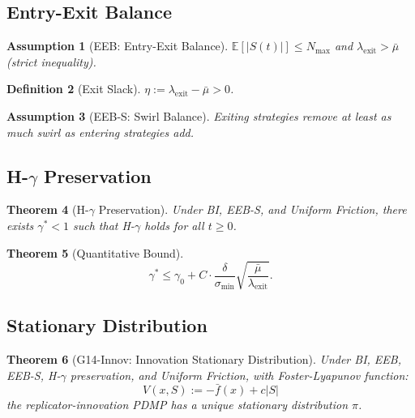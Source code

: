 \documentclass[12pt]{article}
\newtheorem{theorem}{Theorem}[section]
\newtheorem{definition}[theorem]{Definition}
\newtheorem{assumption}[theorem]{Assumption}
\newcommand{\E}{\mathbb{E}}
\begin{document}
\subsection{Entry-Exit Balance}

\begin{assumption}[EEB: Entry-Exit Balance]
$\E[|S(t)|] \leq N_{\max}$ and $\lambda_{\mathrm{exit}} > \bar{\mu}$ (strict inequality).
\end{assumption}

\begin{definition}[Exit Slack]
$\eta := \lambda_{\mathrm{exit}} - \bar{\mu} > 0$.
\end{definition}

\begin{assumption}[EEB-S: Swirl Balance]
Exiting strategies remove at least as much swirl as entering strategies add.
\end{assumption}

\subsection{H-$\gamma$ Preservation}

\begin{theorem}[H-$\gamma$ Preservation]
\label{thm:h-gamma-preservation}
Under BI, EEB-S, and Uniform Friction, there exists $\gamma^* < 1$ such that H-$\gamma$ holds for all $t \geq 0$.
\end{theorem}

\begin{theorem}[Quantitative Bound]
\[
\gamma^* \leq \gamma_0 + C \cdot \frac{\delta}{\sigma_{\min}} \sqrt{\frac{\bar{\mu}}{\lambda_{\mathrm{exit}}}}.
\]
\end{theorem}

\subsection{Stationary Distribution}

\begin{theorem}[G14-Innov: Innovation Stationary Distribution]
\label{thm:g14}
Under BI, EEB, EEB-S, H-$\gamma$ preservation, and Uniform Friction, with Foster-Lyapunov function:
\[
V(x, S) := -\bar{f}(x) + c|S|
\]
the replicator-innovation PDMP has a unique stationary distribution $\pi$.
\end{theorem}
\end{document}
